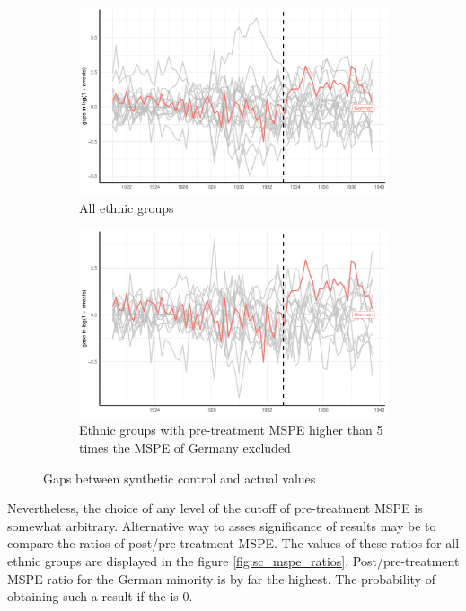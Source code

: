 \begin{figure}[hbtp] 
\begin{subfigure}{\textwidth}
\includegraphics[width=0.9\linewidth]{plots/synthetic_control/until_pact/placebo_highlight_all.pdf}
\caption{All ethnic groups}
\label{fig:sc_placebo_gaps_all}
\end{subfigure}
\begin{subfigure}{\textwidth}
\includegraphics[width=0.9\linewidth]{plots/synthetic_control/until_pact/placebo_highlight_mspe_5_lower.pdf}
\caption{Ethnic groups with pre-treatment MSPE higher than 5 times the MSPE of Germany excluded}
\label{fig:sc_placebo_gaps_all_5_times}
\end{subfigure}
\caption{Gaps between synthetic control and actual values}
\label{fig:sc_placebo_gaps}
\end{figure}

Nevertheless, the choice of any level of the cutoff of pre-treatment MSPE %
is somewhat arbitrary. Alternative way to asses significance of results may be to compare the ratios of  post/pre-treatment MSPE.  The values of these ratios for all ethnic groups are displayed in the figure \ref{fig:sc_mspe_ratios}. Post/pre-treatment MSPE ratio for the German minority is by far the highest. The probability of obtaining such a result if the is 0. 

